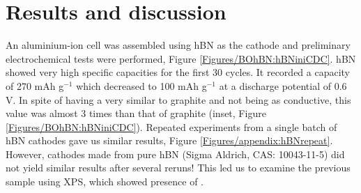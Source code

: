\section{Results and discussion}
An aluminium-ion cell was assembled using hBN as the cathode and preliminary electrochemical tests were performed, Figure \ref{Figures/BOhBN:hBNiniCDC}. hBN showed very high specific capacities for the first 30 cycles. It recorded a capacity of 270 mAh g$^{-1}$ which decreased to 100 mAh g$^{-1}$ at a discharge potential of 0.6 V. In spite of having a very similar to graphite and not being as conductive, this value was almost 3 times than that of graphite (inset, Figure \ref{Figures/BOhBN:hBNiniCDC}). Repeated experiments from a single batch of hBN cathodes gave us similar results, Figure \ref{Figures/appendix:hBNrepeat}. However, cathodes made from pure hBN (Sigma Aldrich, CAS: 10043-11-5) did not yield similar results after several reruns! This led us to examine the previous sample using XPS, which showed presence of . 

